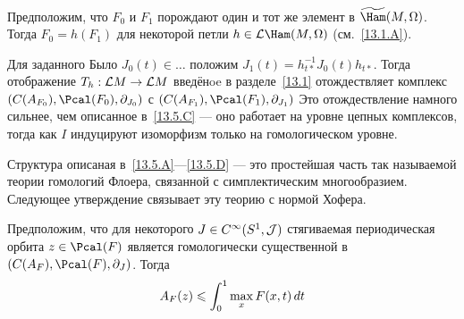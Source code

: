 \begin{ex}{}\label{13.5.D}
Предположим, что $F_{0}$ и $F_{1}$ порождают один и тот же элемент в $\widetilde\Ham(M,\Omega)$.
Тогда $F_{0} = h(F_{1})$ для некоторой петли $h\in\L\Ham(M,\Omega)$
(см.~\ref{13.1.A}).
\end{ex}

Для заданного 
{Было $J_{0}(t)\in\dots$} положим
$J_{1}(t)=h_{t*}^{-1}J_{0}(t)h_{t*}$. Тогда отображение $T_{h}:\mathcal{L}
M\to\mathcal{L} M$ введёнoe в разделе~\ref{13.1} отождествляет
комплекс $(C(A_{F_{0}}),\Pcal(F_{0}),\partial_{J_{0}})$ с
$(C(A_{F_{1}}),\Pcal(F_{1}),\partial_{J_{1}})$ 
Это отождествление намного сильнее, чем описанное в~\ref{13.5.C}
--- оно работает на уровне цепных комплексов, тогда как $I$ индуцируют
изоморфизм только на гомологическом уровне. 

\medskip
Структура описаная в~\ref{13.5.A}---\ref{13.5.D}
--- это простейшая часть так называемой теории гомологий
Флоера, связанной с симплектическим многообразием. 
Следующее утверждение связывает эту теорию с нормой Хофера.

\begin{ex}{}\label{13.5.E}
Предположим, что для некоторого $J\in C^{\infty}(S^{1},\mathcal{J})$
стягиваемая периодическая орбита $z\in\Pcal(F)$ является гомологически
существенной в $(C(A_{F}),\Pcal(F),\partial_{J})$. Тогда
\[
A_{F}(z)\leqslant\int_{0}^{1}\max_{x}F(x,t)\,d t
\]
\end{ex}

